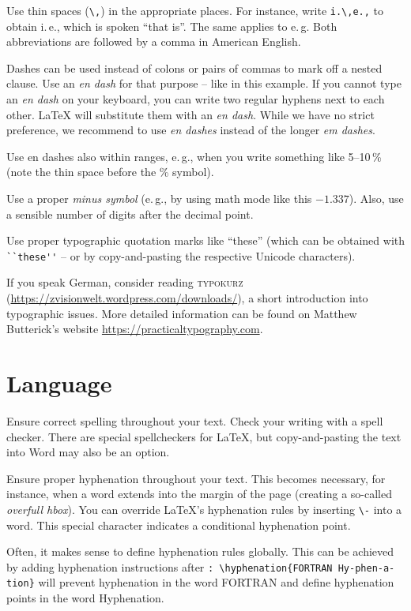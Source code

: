 Use thin spaces (\verb|\,|) in the appropriate places. For instance, write \verb|i.\,e.,| to obtain i.\,e., which is spoken ``that is''. The same applies to e.\,g. Both abbreviations are followed by a comma in American English.

Dashes can be used instead of colons or pairs of commas to mark off a nested clause. Use an \emph{en dash} for that purpose -- like in this example. If you cannot type an \emph{en dash} on your keyboard, you can write two regular hyphens next to each other. LaTeX will substitute them with an \emph{en dash}. While we have no strict preference, we recommend to use \emph{en dashes} instead of the longer \emph{em dashes}.

Use en dashes also within ranges, e.\,g., when you write something like 5--10\,\% (note the thin space before the \% symbol).

Use a proper \emph{minus symbol} (e.\,g., by using math mode like this \(-1.337\)). Also, use a sensible number of digits after the decimal point.

Use proper typographic quotation marks like ``these'' (which can be obtained with \verb|``these''| -- or by copy-and-pasting the respective Unicode characters).

If you speak German, consider reading \textsc{typokurz} (\url{https://zvisionwelt.wordpress.com/downloads/}), a short introduction into typographic issues. More detailed information can be found on Matthew Butterick's website \url{https://practicaltypography.com}.

\section{Language}

Ensure correct spelling throughout your text. Check your writing with a spell checker. There are special spellcheckers for LaTeX, but copy-and-pasting the text into Word may also be an option.

Ensure proper hyphenation throughout your text. This becomes necessary, for instance, when a word extends into the margin of the page (creating a so-called \emph{overfull hbox}). You can override LaTeX's hyphenation rules by inserting \verb|\-| into a word. This special character indicates a conditional hyphenation point.

Often, it makes sense to define hyphenation rules globally. This can be achieved by adding hyphenation instructions after \verb|: |\verb|\hyphenation{FORTRAN Hy-phen-a-tion}| will prevent hyphenation in the word FORTRAN and define hyphenation points in the word Hyphenation.

